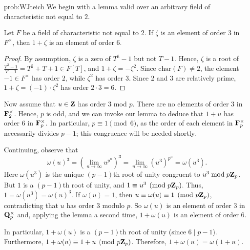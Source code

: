 \begin{sol}{prob:WJteich} We begin with a lemma valid over an arbitrary field of characteristic not equal to $2$.

\begin{lem} Let $F$ be a field of characteristic not equal to $2$. If $\zeta$ is an element of order $3$ in $F^{\times}$, then $1+\zeta$ is an element of order $6$.
\end{lem}


\begin{proof} By assumption, $\zeta$ is a zero of $T^3-1$ but not $T-1$. Hence, $\zeta$ is a root of $\frac{T^3-1}{T-1} = T^2+T+1 \in F[T]$, and $1+\zeta = -\zeta^2$. Since $\mathrm{char}(F)\ne 2$, the element $-1 \in F^{\times}$ has order $2$, while $\zeta^2$ has order $3$. Since $2$ and $3$ are relatively prime, $1+\zeta = (-1)\cdot \zeta^2$ has order $2\cdot 3=6$.
\end{proof}

Now assume that $u \in \mathbf{Z}$ has order $3$ mod $p$. There are no elements of order $3$ in $\mathbf{F}_2^{\times}$. Hence, $p$ is odd, and we can invoke our lemma to deduce that $1+u$ has order $6$ in $\mathbf{F}_p^{\times}$. In particular, $p\equiv 1\pmod{6}$, as the order of each element in $\mathbf{F}_p^{\times}$ necessarily divides $p-1$; this congruence will be needed shortly.

Continuing, observe that $$ \omega(u)^3 = (\lim_{n\to\infty} u^{p^n})^3 = \lim_{n\to\infty} (u^{3})^{p^n} = \omega(u^3). $$ 
Here $\omega(u^3)$ is the unique $(p-1)$th root of unity congruent to $u^3 \bmod{p\mathbf{Z}_p}$. But $1$ is a $(p-1)$th root of unity, and $1 \equiv u^3 \pmod{p\mathbf{Z}_p}$.  Thus, $1 = \omega(u^3) = \omega(u)^3$. If $\omega(u)=1$, then $u\equiv \omega(u) \equiv 1\pmod{p\mathbf{Z}_p}$, contradicting that $u$ has order $3$ modulo $p$. So $\omega(u)$ is an element of order $3$ in $\mathbf{Q}_p^{\times}$ and, applying the lemma a second time, $1+\omega(u)$ is an element of order $6$. 

In particular, $1+\omega(u)$ is a $(p-1)$th root of unity (since $6\mid p-1$). Furthermore, $1+\omega(u)\equiv 1+u \pmod{p\mathbf{Z}_p}$. Therefore, $1+\omega(u) = \omega(1+u)$.
\end{sol}


